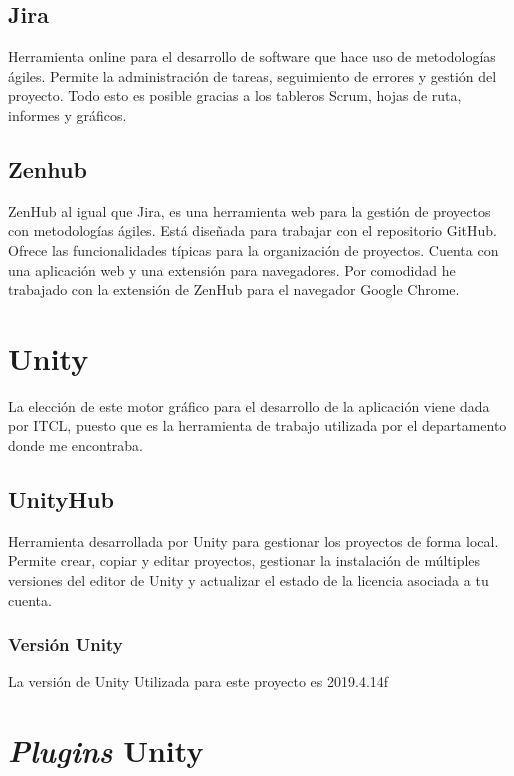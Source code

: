 \subsection{Jira}

Herramienta online para el desarrollo de software que hace uso de metodologías ágiles. Permite la administración de tareas, seguimiento de errores y gestión del proyecto. Todo esto es posible gracias a los tableros Scrum, hojas de ruta, informes y gráficos. 

\subsection{Zenhub}

ZenHub al igual que Jira, es una herramienta web para la gestión de proyectos con metodologías ágiles. Está diseñada para trabajar con el repositorio GitHub. Ofrece las funcionalidades típicas para la organización de proyectos. Cuenta con una aplicación web y una extensión para navegadores. Por comodidad he trabajado con la extensión de ZenHub para el navegador Google Chrome.

\section{Unity}

La elección de este motor gráfico para el desarrollo de la aplicación viene dada por ITCL, puesto que es la herramienta de trabajo utilizada por el departamento donde me encontraba.

\subsection{UnityHub}

Herramienta desarrollada por Unity para gestionar los proyectos de forma local. Permite crear, copiar y editar proyectos, gestionar la instalación de múltiples versiones del editor de Unity y actualizar el estado de la licencia asociada a tu cuenta.

\subsubsection{Versión Unity}

La versión de Unity Utilizada para este proyecto es 2019.4.14f

\section{\textit{Plugins} Unity}

